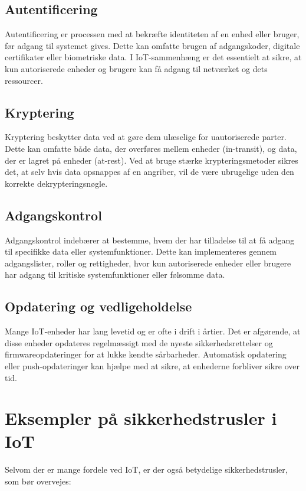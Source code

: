 \documentclass[12pt,a4paper]{book}
\begin{document}
	\subsection*{Autentificering}
	Autentificering er processen med at bekræfte identiteten af en enhed eller bruger, før adgang til systemet gives. Dette kan omfatte brugen af adgangskoder, digitale certifikater eller biometriske data. I IoT-sammenhæng er det essentielt at sikre, at kun autoriserede enheder og brugere kan få adgang til netværket og dets ressourcer.
	
	\subsection*{Kryptering}
	Kryptering beskytter data ved at gøre dem ulæselige for uautoriserede parter. Dette kan omfatte både data, der overføres mellem enheder (in-transit), og data, der er lagret på enheder (at-rest). Ved at bruge stærke krypteringsmetoder sikres det, at selv hvis data opsnappes af en angriber, vil de være ubrugelige uden den korrekte dekrypteringsnøgle.
	
	\subsection*{Adgangskontrol}
	Adgangskontrol indebærer at bestemme, hvem der har tilladelse til at få adgang til specifikke data eller systemfunktioner. Dette kan implementeres gennem adgangslister, roller og rettigheder, hvor kun autoriserede enheder eller brugere har adgang til kritiske systemfunktioner eller følsomme data.
	
	\subsection*{Opdatering og vedligeholdelse}
	Mange IoT-enheder har lang levetid og er ofte i drift i årtier. Det er afgørende, at disse enheder opdateres regelmæssigt med de nyeste sikkerhedsrettelser og firmwareopdateringer for at lukke kendte sårbarheder. Automatisk opdatering eller push-opdateringer kan hjælpe med at sikre, at enhederne forbliver sikre over tid.
	
	\section*{Eksempler på sikkerhedstrusler i IoT}
	Selvom der er mange fordele ved IoT, er der også betydelige sikkerhedstrusler, som bør overvejes:
	
\end{document}
